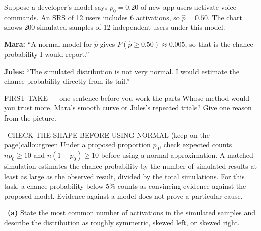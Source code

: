 \documentclass[11pt]{article}
\begin{document}
Suppose a developer's model says $p_0=0.20$ of new app users activate voice commands. An SRS of 12 users includes 6 activations, so $\hat p=0.50$. The chart shows 200 simulated samples of 12 independent users under this model.\par\smallskip \textbf{Mara:} ``A normal model for $\hat p$ gives $P(\hat p\ge 0.50)\approx0.005$, so that is the chance probability I would report.''\par \textbf{Jules:} ``The simulated distribution is not very normal. I would estimate the chance probability directly from its tail.''\par
\begin{center}
\end{center}
\begin{firsttakebox}{FIRST TAKE --- one sentence before you work the parts}
Whose method would you trust more, Mara's smooth curve or Jules's repeated trials? Give one reason from the picture.\par
{}
\end{firsttakebox}

\begin{callout}{\IconBook\ CHECK THE SHAPE BEFORE USING NORMAL (keep on the page)}{calloutgreen}
Under a proposed proportion $p_0$, check expected counts $np_0\geq10$ and $n(1-p_0)\geq10$ before using a normal approximation.
A matched simulation estimates the chance probability by the number of simulated results at least as large as the observed result, divided by the total simulations.
For this task, a chance probability below $5\%$ counts as convincing evidence against the proposed model.
Evidence against a model does not prove a particular cause.
\end{callout}

~\textbf{(a)} State the most common number of activations in the simulated samples and describe the distribution as roughly symmetric, skewed left, or skewed right.\par
{}
\end{document}
